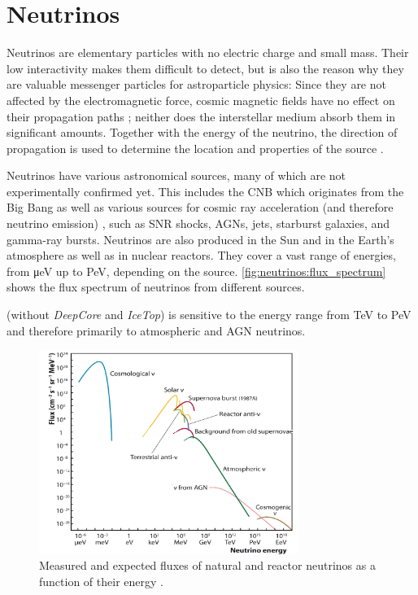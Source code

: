 \section{Neutrinos}

Neutrinos are elementary particles with no electric charge and small mass. %
Their low interactivity
  makes them difficult to detect,
  but is also the reason why they are valuable messenger particles for astroparticle physics:
Since they are not affected by the electromagnetic force,
  cosmic magnetic fields have no effect on their propagation paths \cite{neutrinos_katz};
  neither does the interstellar medium absorb them in significant amounts.
Together with the energy of the neutrino,
  the direction of propagation %
  is used to determine the location and properties of the source \cite{neutrinos_katz}.


Neutrinos have various astronomical sources,
  many of which are not experimentally confirmed yet.
This includes
  the \ac{CNB} \cite{follin2015}
     which originates from the Big Bang
  as well as various sources for cosmic ray acceleration
    (and therefore neutrino emission)
  \cite{neutrinos_aartsen_sources},
  such as
    \ac{SNR} shocks,
    \acp{AGN},
    jets,
    starburst galaxies, %
    and gamma-ray bursts.
Neutrinos are also produced in
  the Sun
  and in the Earth's atmosphere %
  as well as in nuclear reactors.
They cover a vast range of energies, from \si{\micro\electronvolt} up to \si{\peta\electronvolt},
  depending on the source. \citationneeded{}
\autoref{fig:neutrinos:flux_spectrum} shows the flux spectrum of neutrinos from different sources.

\icecube{}
  (without \emph{DeepCore} and \emph{IceTop})
is sensitive to
  the energy range from \si{\tera\electronvolt} to \si{\peta\electronvolt} \cite{icecube_aartsen} %
  and therefore primarily to atmospheric and \ac{AGN} neutrinos.

\begin{figure}
  \centering
  \includegraphics[width=0.75\textwidth]{content/img/neutrino_spectrum.png}
  \caption{
    Measured and expected fluxes of natural and reactor neutrinos as a function of their energy \cite{spiering2012}.
  }
  \label{fig:neutrinos:flux_spectrum}
\end{figure}


